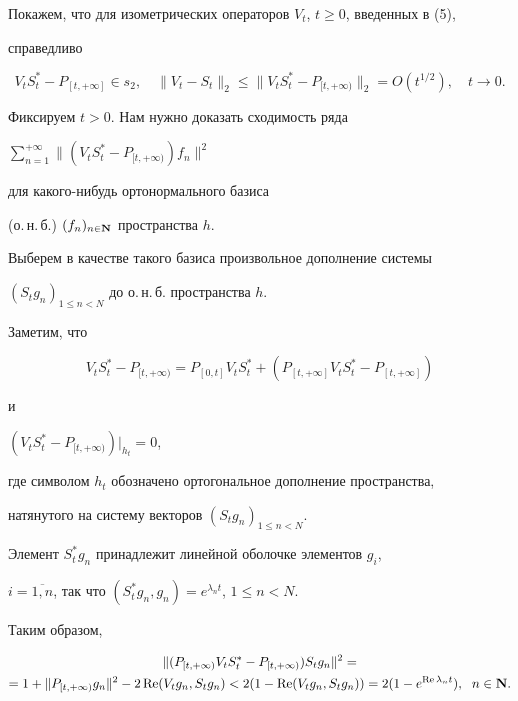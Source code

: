 Покажем, что для изометрических операторов $V_t$, $t\geq 0$, введенных в (5),


справедливо


$$


V_tS_t^*-P_{[t,+\infty ]}\in s_2,\quad


\|V_t-S_t\|_2\leq \|V_tS_t^*-P_{[t,+\infty)}\|_2


=O(t^{1/2}),\quad t\to 0.


$$





Фиксируем $t>0$. Нам нужно доказать сходимость ряда


$\sum \limits_{n=1}^{+\infty}\|(V_tS_t^*-P_{[t,+\infty)})f_n\|^2$


для какого-нибудь ортонормального базиса


(о.\,н.\,б.) $(f_n)_{n\in \bold N}$ пространства $h$.


Выберем в качестве такого базиса произвольное дополнение системы


$(S_tg_n)_{1\leq n<N}$ до о.\,н.\,б. пространства $h$.





Заметим, что


$$


V_tS_t^*-P_{[t,+\infty)}=


P_{[0,t]}V_tS_t^*+(P_{[t,+\infty ]}V_tS_t^*-P_{[t,+\infty ]})


$$


и


$(V_tS_t^*-P_{[t,+\infty)})|_{h_t}=0$,


где символом $h_t$ обозначено ортогональное дополнение пространства,


натянутого на систему векторов $(S_tg_n)_{1\leq n<N}$.


Элемент $S_t^*g_n$ принадлежит линейной оболочке элементов $g_i$,


$i=\overline{1,n}$, так что $(S_t^*g_n,g_n)=e^{\lambda_nt}$, $1\leq n<N$.


Таким образом,


\begin{multline}


\|(P_{[t,+\infty)}V_tS_t^*-P_{[t,+\infty)})S_tg_n\|^2= \\


%


=1+\|P_{[t,+\infty)}g_n\|^2-


2\re(V_tg_n,S_tg_n)<


2(1-\re(V_tg_n,S_tg_n))=2(1-e^{\re\lambda_nt}),\ \; n\in \bold N.


\end{multline}


